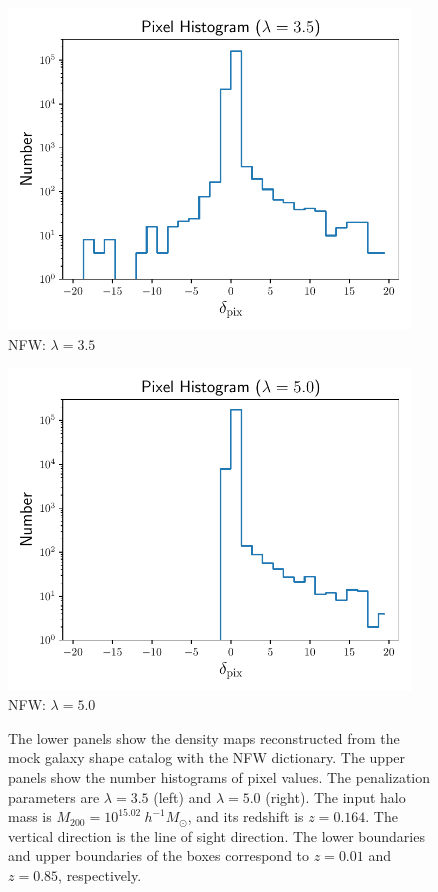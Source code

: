 \begin{figure}[!t]
\begin{minipage}[c]{1.0\columnwidth}
\includegraphics[width=0.95\textwidth]{pixel_histograms_halo17_NFW_lbd35.pdf}
    \centering
    \small NFW: $\lambda=3.5$
\end{minipage}
\begin{minipage}[c]{1.0\columnwidth}
\includegraphics[width=0.95\textwidth]{pixel_histograms_halo17_NFW_lbd50.pdf}
    \centering
    \small
    NFW: $\lambda=5.0$
\end{minipage}
\caption{The lower panels show the density maps reconstructed from the mock
    galaxy shape catalog with the NFW dictionary. The upper panels show the
    number histograms of pixel values.  The penalization parameters are
    $\lambda=3.5$ (left) and $\lambda=5.0$ (right).  The input halo mass is
    $M_{200}=10^{15.02} ~h^{-1}M_{\odot}$, and its redshift is $z=0.164$.  The
    vertical direction is the line of sight direction. The lower boundaries and
    upper boundaries of the boxes correspond to $z=0.01$ and $z=0.85$,
    respectively.
    } \label{fig_NFW3D}
\end{figure}

